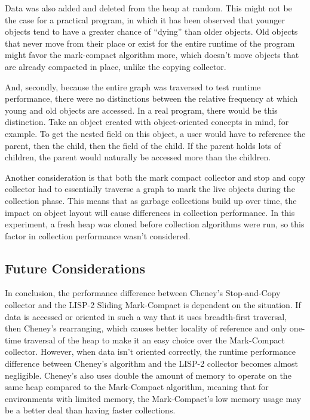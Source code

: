 \documentclass[index]{subfiles}
\begin{document}
Data was also added and deleted from the heap at random. This might not be the case for a practical program, in which it has been observed that younger objects tend to have a greater chance of ``dying'' than older objects\cite{youtube_introductory_video}. Old objects that never move from their place or exist for the entire runtime of the program might favor the mark-compact algorithm more, which doesn't move objects that are already compacted in place, unlike the copying collector. 

And, secondly, because the entire graph was traversed to test runtime performance, there were no distinctions between the relative frequency at which young and old objects are accessed. In a real program, there would be this distinction. Take an object created with object-oriented concepts in mind, for example. To get the nested field on this object, a user would have to reference the parent, then the child, then the field of the child. If the parent holds lots of children, the parent would naturally be accessed more than the children. 


Another consideration is that both the mark compact collector and stop and copy collector had to essentially traverse a graph to mark the live objects during the collection phase. This means that as garbage collections build up over time, the impact on object layout will cause differences in collection performance. In this experiment, a fresh heap was cloned before collection algorithms were run, so this factor in collection performance wasn't considered.

\subsection{Future Considerations}

In conclusion, the performance difference between Cheney's Stop-and-Copy collector and the LISP-2 Sliding Mark-Compact is dependent on the situation. If data is accessed or oriented in such a way that it uses breadth-first traversal, then Cheney's rearranging, which causes better locality of reference and only one-time traversal of the heap to make it an easy choice over the Mark-Compact collector. However, when data isn't oriented correctly, the runtime performance difference between Cheney's algorithm and the LISP-2 collector becomes almost negligible. Cheney's also uses double the amount of memory to operate on the same heap compared to the Mark-Compact algorithm, meaning that for environments with limited memory, the Mark-Compact's low memory usage may be a better deal than having faster collections.
\end{document}
